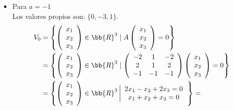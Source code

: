 \begin{ejercicio}
\begin{enumerate}
\begin{itemize}
            \item Para $a=-1$\\
            Los valores propios son: $\{0, -3, 1\}$.
            \begin{equation*}\begin{split}
            V_0 & = \left\{ \left(\begin{array}{c}
                    x_1 \\
                    x_2 \\
                    x_3
               \end{array}\right) \in \bb{R}^3 \mid A\left(\begin{array}{c}
                    x_1 \\
                    x_2 \\
                    x_3
               \end{array}\right) = 0 \right\} \\
               & = \left\{ \left(\begin{array}{c}
                    x_1 \\
                    x_2 \\
                    x_3
               \end{array}\right) \in \bb{R}^3 \mid \left( \begin{array}{ccc}
                -2 & 1 & -2 \\
                2 & 1 & 2 \\
                -1 & -1 & -1 \\
            \end{array}\right) \left(\begin{array}{c}
                    x_1 \\
                    x_2 \\
                    x_3
               \end{array}\right) = 0 \right\} \\
               & = \left\{ \left(\begin{array}{c}
                    x_1 \\
                    x_2  \\
                    x_3
               \end{array}\right) \in \bb{R}^3 \left|
               \begin{array}{c}
                    2x_1-x_2+2x_3=0  \\
                    x_1+x_2+x_3 = 0 
               \end{array}\right. \right\} =

\end{split}
\end{equation*}
\end{itemize}
\end{enumerate}
\end{ejercicio}
